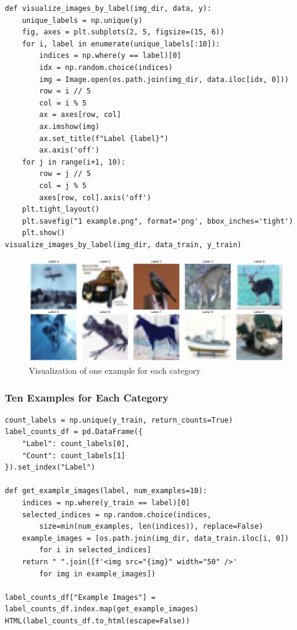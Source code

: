 \documentclass[a4paper,11pt]{article}
\begin{document}
\begin{listing}[!ht]
\begin{verbatim}
def visualize_images_by_label(img_dir, data, y):
    unique_labels = np.unique(y)
    fig, axes = plt.subplots(2, 5, figsize=(15, 6))
    for i, label in enumerate(unique_labels[:10]): 
        indices = np.where(y == label)[0]
        idx = np.random.choice(indices)
        img = Image.open(os.path.join(img_dir, data.iloc[idx, 0]))
        row = i // 5
        col = i % 5
        ax = axes[row, col] 
        ax.imshow(img)
        ax.set_title(f"Label {label}")
        ax.axis('off')
    for j in range(i+1, 10):
        row = j // 5
        col = j % 5
        axes[row, col].axis('off')
    plt.tight_layout()
    plt.savefig("1 example.png", format='png', bbox_inches='tight')
    plt.show()
visualize_images_by_label(img_dir, data_train, y_train)
\end{verbatim}
\label{listing:python}
\end{listing}

\begin{figure}[H]
    \centering
    \includegraphics[width=\linewidth]{./img/1 example.png}
    \caption[Label count]{Visualization of one example for each category}
    \label{fig:example}
\end{figure}

\subsubsection{Ten Examples for Each Category}
\begin{listing}[!ht]
\begin{verbatim}
count_labels = np.unique(y_train, return_counts=True)
label_counts_df = pd.DataFrame({
    "Label": count_labels[0],
    "Count": count_labels[1]
}).set_index("Label")

def get_example_images(label, num_examples=10):
    indices = np.where(y_train == label)[0]
    selected_indices = np.random.choice(indices, 
        size=min(num_examples, len(indices)), replace=False)
    example_images = [os.path.join(img_dir, data_train.iloc[i, 0]) 
        for i in selected_indices]
    return " ".join([f'<img src="{img}" width="50" />' 
        for img in example_images])

label_counts_df["Example Images"] =                               
label_counts_df.index.map(get_example_images)
HTML(label_counts_df.to_html(escape=False))
\end{verbatim}
\label{listing:python}
\end{listing}
\end{document}

